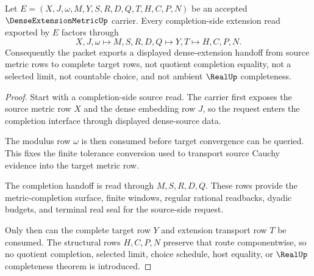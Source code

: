 \begin{theorem}
\label{thm:dense-extension-metric-completion-route}
Let $E=(X,J,\omega,M,Y,S,R,D,Q,T,H,C,P,N)$ be an accepted $\DenseExtensionMetricUp$ carrier. Every completion-side extension read exported by $E$ factors through
$$
X,J,\omega \longmapsto M,S,R,D,Q \longmapsto Y,T \longmapsto H,C,P,N .
$$
Consequently the packet exports a displayed dense-extension handoff from source metric rows to complete target rows, not quotient completion equality, not a selected limit, not countable choice, and not ambient $\RealUp$ completeness.
\end{theorem}
\begin{proof}
Start with a completion-side source read. The carrier first exposes the source metric row $X$ and the dense embedding row $J$, so the request enters the completion interface through displayed dense-source data.

The modulus row $\omega$ is then consumed before target convergence can be queried. This fixes the finite tolerance conversion used to transport source Cauchy evidence into the target metric row.

The completion handoff is read through $M,S,R,D,Q$. These rows provide the metric-completion surface, finite windows, regular rational readbacks, dyadic budgets, and terminal real seal for the source-side request.

Only then can the complete target row $Y$ and extension transport row $T$ be consumed. The structural rows $H,C,P,N$ preserve that route componentwise, so no quotient completion, selected limit, choice schedule, host equality, or $\RealUp$ completeness theorem is introduced.
\end{proof}

